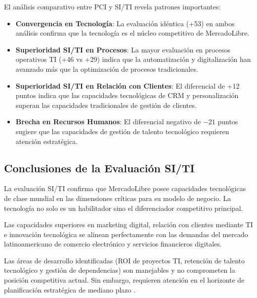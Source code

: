 El análisis comparativo entre PCI y SI/TI revela patrones importantes:

\begin{itemize}
\item \textbf{Convergencia en Tecnología}: La evaluación idéntica (+53) en ambos análisis confirma que la tecnología es el núcleo competitivo de MercadoLibre.

\item \textbf{Superioridad SI/TI en Procesos}: La mayor evaluación en procesos operativos TI (+46 vs +29) indica que la automatización y digitalización han avanzado más que la optimización de procesos tradicionales.

\item \textbf{Superioridad SI/TI en Relación con Clientes}: El diferencial de +12 puntos indica que las capacidades tecnológicas de CRM y personalización superan las capacidades tradicionales de gestión de clientes.

\item \textbf{Brecha en Recursos Humanos}: El diferencial negativo de $-21$ puntos sugiere que las capacidades de gestión de talento tecnológico requieren atención estratégica.
\end{itemize}

\subsection{Conclusiones de la Evaluación SI/TI}

La evaluación SI/TI confirma que MercadoLibre posee capacidades tecnológicas de clase mundial en las dimensiones críticas para su modelo de negocio. La tecnología no solo es un habilitador sino el diferenciador competitivo principal.

Las capacidades superiores en marketing digital, relación con clientes mediante TI e innovación tecnológica se alinean perfectamente con las demandas del mercado latinoamericano de comercio electrónico y servicios financieros digitales.

Las áreas de desarrollo identificadas (ROI de proyectos TI, retención de talento tecnológico y gestión de dependencias) son manejables y no comprometen la posición competitiva actual. Sin embargo, requieren atención en el horizonte de planificación estratégica de mediano plazo \autocite{porter1985, teece2007, grant2016}.
